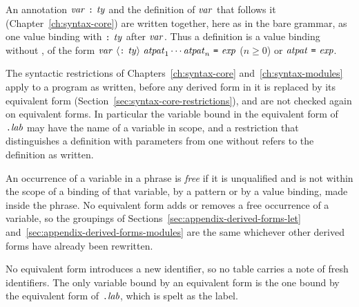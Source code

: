 An annotation $\mathit{var}\ \textnormal{\texttt{:}}\ \mathit{ty}$ and the definition of $\mathit{var}$ that follows it
(Chapter~\ref{ch:syntax-core}) are written together, here as in the bare
grammar, as one value binding with $\textnormal{\texttt{:}}\ \mathit{ty}$ after $\mathit{var}$. Thus a
definition is a value binding without , of the form
$\var\ \opt{\kw{:}\ \ty}\ \atpat_1\cdots\atpat_n\ \kw{=}\ \expm$ ($n\geq 0$)
or $\mathit{atpat}\ \textnormal{\texttt{=}}\ \mathit{exp}$.

The syntactic restrictions of Chapters~\ref{ch:syntax-core}
and~\ref{ch:syntax-modules} apply to a program as written, before any derived
form in it is replaced by its equivalent form
(Section~\ref{sec:syntax-core-restrictions}), and are not checked again on
equivalent forms. In
particular the variable bound in the equivalent form of $\textnormal{\texttt{.}}\mathit{lab}$ may have
the name of a variable in scope, and a restriction that distinguishes a
definition with parameters from one without refers to the definition as
written. %

An occurrence of a variable in a phrase is \emph{free} if it is unqualified
and is not within the scope of a binding of that variable, by a pattern or by
a value binding, made inside the phrase. No equivalent form adds or removes a
free occurrence of a variable, so the groupings of
Sections~\ref{sec:appendix-derived-forms-let}
and~\ref{sec:appendix-derived-forms-modules} are the same whichever other
derived forms have already been rewritten.

No equivalent form introduces a new identifier, so no table carries a note of
fresh identifiers. %
The only variable bound by an equivalent form is the one bound by the
equivalent form of $\textnormal{\texttt{.}}\mathit{lab}$, which is spelt as the label.

